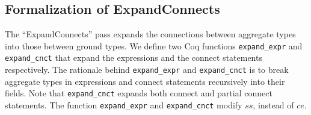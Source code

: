 \subsection{Formalization of ExpandConnects}
The ``ExpandConnects'' pass expands the connections between aggregate types into those between ground types. 
We define two Coq functions {\tt expand\_expr} and {\tt expand\_cnct} that expand the expressions and the connect statements respectively. 
The rationale behind {\tt expand\_expr} and {\tt expand\_cnct} is to break aggregate types in expressions and connect statements recursively into their fields. Note that {\tt expand\_cnct} expands both connect and partial connect statements. The function {\tt expand\_expr} and {\tt expand\_cnct} modify $ss$, instead of $ce$.
%


